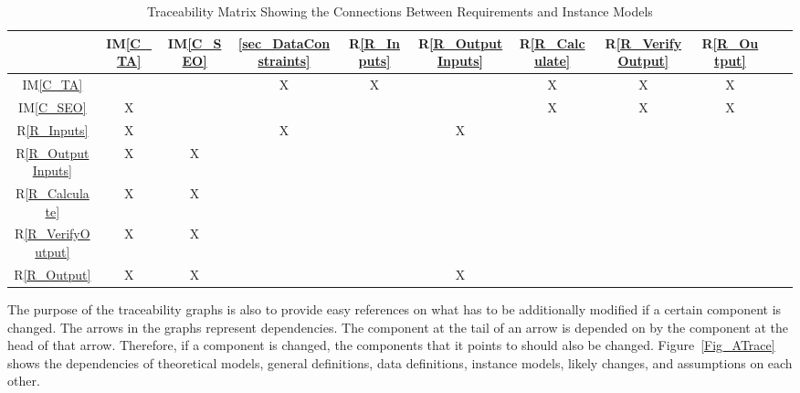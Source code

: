 \documentclass[12pt]{article}
\newcommand{\iref}[1]{IM\ref{#1}}
\newcommand{\rref}[1]{R\ref{#1}}
\begin{document}
\begin{table}[h!]
\centering
\begin{tabular}{|c|c|c|c|c|c|c|c|c|c|c|}
\hline
	& \iref{C_TA}  & \iref{C_SEO}& \ref{sec_DataConstraints}& \rref{R_Inputs}& \rref{R_OutputInputs} & \rref{R_Calculate}& \rref{R_VerifyOutput}& \rref{R_Output}\\

\hline
\iref{C_TA}         				&    &    & X & X &     & X  & X  &X \\ \hline
\iref{C_SEO}           		& X &    &    &    &     & X  & X  &X \\ \hline
\rref{R_Inputs}    				& X &    & X &    & X  &     &     &     \\ \hline
\rref{R_OutputInputs}  & X & X &    &    &     &     &     &     \\ \hline
\rref{R_Calculate}  		& X & X &    &    &     &     &     &     \\ \hline
\rref{R_VerifyOutput}  & X & X &    &    &     &      &     &    \\ \hline 
\rref{R_Output}       		& X & X &    &    & X &      &     &    \\ \hline
\hline
\end{tabular}
\caption{Traceability Matrix Showing the Connections Between Requirements and Instance Models}
\label{Table:R_trace}
\end{table}

The purpose of the traceability graphs is also to provide easy references on
what has to be additionally modified if a certain component is changed.  The
arrows in the graphs represent dependencies. The component at the tail of an
arrow is depended on by the component at the head of that arrow. Therefore, if a
component is changed, the components that it points to should also be
changed. Figure~\ref{Fig_ATrace} shows the dependencies of theoretical models,
general definitions, data definitions, instance models, likely changes, and
assumptions on each other. 

\end{document}
